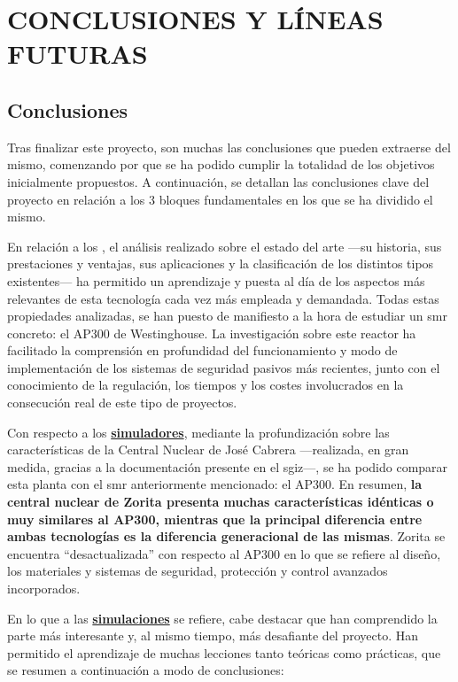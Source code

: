 \newpage
\section{CONCLUSIONES Y LÍNEAS FUTURAS} \label{conclusiones}

\subsection{Conclusiones}

Tras finalizar este proyecto, son muchas las conclusiones que pueden extraerse del mismo, comenzando por que se ha podido cumplir la totalidad de los objetivos inicialmente propuestos. A continuación, se detallan las conclusiones clave del proyecto en relación a los 3 bloques fundamentales en los que se ha dividido el mismo.

En relación a los \underline{\textbf{}}, el análisis realizado sobre el estado del arte ---su historia, sus prestaciones y ventajas, sus aplicaciones y la clasificación de los distintos tipos existentes--- ha permitido un aprendizaje y puesta al día de los aspectos más relevantes de esta tecnología cada vez más empleada y demandada. Todas estas propiedades analizadas, se han puesto de manifiesto a la hora de estudiar un \acrlong{smr} concreto: el AP300 de Westinghouse. La investigación sobre este reactor ha facilitado la comprensión en profundidad del funcionamiento y modo de implementación de los sistemas de seguridad pasivos más recientes, junto con el conocimiento de la regulación, los tiempos y los costes involucrados en la consecución real de este tipo de proyectos.

Con respecto a los \underline{\textbf{simuladores}}, mediante la profundización sobre las características de la Central Nuclear de José Cabrera ---realizada, en gran medida, gracias a la documentación presente en el \acrshort{sgiz}---, se ha podido comparar esta planta con el \acrshort{smr} anteriormente mencionado: el AP300. En resumen, \textbf{la central nuclear de Zorita presenta muchas características idénticas o muy similares al AP300, mientras que la principal diferencia entre ambas tecnologías es la diferencia generacional de las mismas}. Zorita se encuentra ``desactualizada'' con respecto al AP300 en lo que se refiere al diseño, los materiales y sistemas de seguridad, protección y control avanzados incorporados.

En lo que a las \underline{\textbf{simulaciones}} se refiere, cabe destacar que han comprendido la parte más interesante y, al mismo tiempo, más desafiante del proyecto. Han permitido el aprendizaje de muchas lecciones tanto teóricas como prácticas, que se resumen a continuación a modo de conclusiones:

